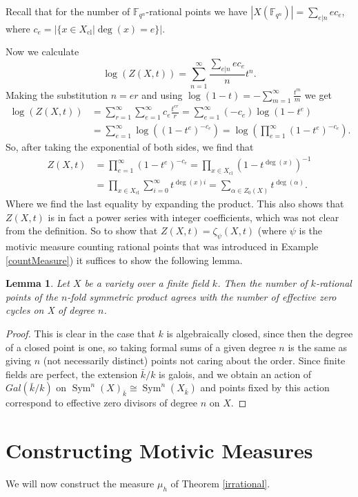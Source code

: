 \documentclass[11pt, a4paper, english, twoside]{article}
\theoremstyle{plain}
\newtheorem{lemma}[theorem]{Lemma}
\theoremstyle{definition}
\DeclareMathOperator{\Sym}{Sym}
\begin{document}
Recall that for the number of $\mathbb{F}_{q^n}$-rational points we have
$|X(\mathbb{F}_{q^n})| = \sum_{e | n} e c_e$, where $c_e = |\{x \in X_{\mathrm{cl}} | \deg(x) = e\}|$. 

Now we calculate
\[
\log(Z(X,t)) = \sum_{n=1}^\infty \frac{\sum_{e | n} ec_e}{n} t^n.
\]
Making the substitution $n = er$ and using $\log(1-t) = - \sum_{m=1}^\infty \frac{t^m}{m}$ we get 
\begin{align*}
    \log(Z(X,t)) &= \sum_{r=1}^\infty \sum_{e=1}^\infty c_e \frac{t^{er}}{r} = \sum_{e=1}^\infty (-c_e) \log(1-t^e) \\
                 &= \sum_{e=1}^\infty \log ( (1-t^e)^{-c_e} ) = \log(\prod_{e=1}^\infty (1-t^e)^{-c_e}).
\end{align*}
So, after taking the exponential of both sides, we find that
\begin{align*}
    Z(X,t) &= \prod_{e=1}^\infty (1-t^e)^{-c_e} = \prod_{x \in X_{\mathrm{cl}}} (1-t^{\deg(x)})^{-1}\\
           &= \prod_{x \in X_{\mathrm{cl}}} \sum_{i=0}^\infty t^{\deg(x)i} = \sum_{\alpha \in Z_0(X)} t^{\deg(\alpha)}.
\end{align*}
Where we find the last equality by expanding the product. This also shows that $Z(X,t)$ is in fact a power series with integer coefficients, which
was not clear from the definition.
So to show that $Z(X,t) = \zeta_{\psi}(X,t)$ 
(where $\psi$ is the motivic measure counting rational points that was introduced in Example \ref{countMeasure}) 
it suffices to show the following lemma.

\begin{lemma}
    Let $X$ be a variety over a finite field $k$. Then the number of $k$-rational points of the $n$-fold symmetric product agrees
    with the number of effective zero cycles on X of degree $n$.
\end{lemma}
\begin{proof}
    This is clear in the case that $k$ is algebraically closed, since then the degree of a closed point is one, so taking formal sums of
    a given degree $n$ is the same as giving $n$ (not necessarily distinct) points not caring about the order.
    Since finite fields are perfect, the extension $\bar{k}/k$ is galois, and we obtain an action of $Gal(\bar{k}/k)$ on
    $\Sym^n(X)_{\bar{k}} \cong \Sym^n(X_{\bar{k}})$ and points fixed by this action correspond to effective zero divisors of degree $n$
    on $X$.
\end{proof}

\section{Constructing Motivic Measures}
\label{const}
We will now construct the measure $\mu_h$ of Theorem \ref{irrational}.
\end{document}

